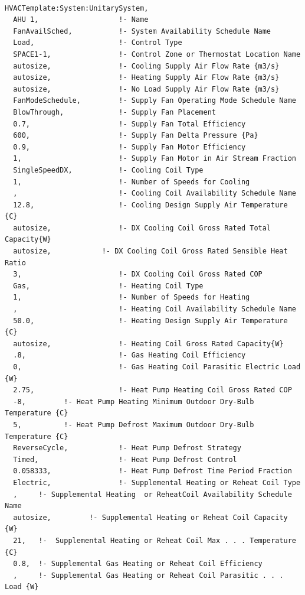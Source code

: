 \begin{lstlisting}

HVACTemplate:System:UnitarySystem,
  AHU 1,                   !- Name
  FanAvailSched,           !- System Availability Schedule Name
  Load,                    !- Control Type
  SPACE1-1,                !- Control Zone or Thermostat Location Name
  autosize,                !- Cooling Supply Air Flow Rate {m3/s}
  autosize,                !- Heating Supply Air Flow Rate {m3/s}
  autosize,                !- No Load Supply Air Flow Rate {m3/s}
  FanModeSchedule,         !- Supply Fan Operating Mode Schedule Name
  BlowThrough,             !- Supply Fan Placement
  0.7,                     !- Supply Fan Total Efficiency
  600,                     !- Supply Fan Delta Pressure {Pa}
  0.9,                     !- Supply Fan Motor Efficiency
  1,                       !- Supply Fan Motor in Air Stream Fraction
  SingleSpeedDX,           !- Cooling Coil Type
  1,                       !- Number of Speeds for Cooling
  ,                        !- Cooling Coil Availability Schedule Name
  12.8,                    !- Cooling Design Supply Air Temperature {C}
  autosize,                !- DX Cooling Coil Gross Rated Total Capacity{W}
  autosize,            !- DX Cooling Coil Gross Rated Sensible Heat Ratio
  3,                       !- DX Cooling Coil Gross Rated COP
  Gas,                     !- Heating Coil Type
  1,                       !- Number of Speeds for Heating
  ,                        !- Heating Coil Availability Schedule Name
  50.0,                    !- Heating Design Supply Air Temperature {C}
  autosize,                !- Heating Coil Gross Rated Capacity{W}
  .8,                      !- Gas Heating Coil Efficiency
  0,                       !- Gas Heating Coil Parasitic Electric Load {W}
  2.75,                    !- Heat Pump Heating Coil Gross Rated COP
  -8,         !- Heat Pump Heating Minimum Outdoor Dry-Bulb Temperature {C}
  5,          !- Heat Pump Defrost Maximum Outdoor Dry-Bulb Temperature {C}
  ReverseCycle,            !- Heat Pump Defrost Strategy
  Timed,                   !- Heat Pump Defrost Control
  0.058333,                !- Heat Pump Defrost Time Period Fraction
  Electric,                !- Supplemental Heating or Reheat Coil Type
  ,     !- Supplemental Heating  or ReheatCoil Availability Schedule Name
  autosize,         !- Supplemental Heating or Reheat Coil Capacity {W}
  21,   !-  Supplemental Heating or Reheat Coil Max . . . Temperature {C}
  0.8,  !- Supplemental Gas Heating or Reheat Coil Efficiency
  ,     !- Supplemental Gas Heating or Reheat Coil Parasitic . . . Load {W}

\end{lstlisting}
